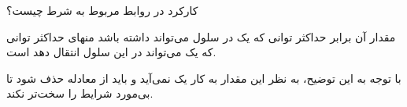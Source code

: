 \Question
{کارکرد 
	در روابط مربوط به شرط 
	چیست؟
}
{
	مقدار آن برابر حداکثر توانی که یک 
	در سلول می‌تواند داشته باشد منهای حداکثر توانی که یک 
	می‌تواند در این سلول انتقال دهد است.
	
	با توجه به این توضیح، به نظر این مقدار به کار یک
	نمی‌آید و باید از معادله حذف شود تا بی‌مورد شرایط را سخت‌تر نکند.
}